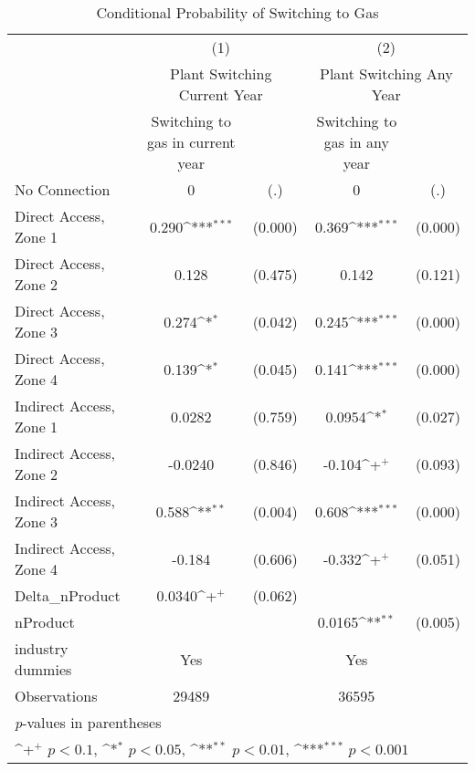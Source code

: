 \begin{table}[htbp]\centering
\def\sym#1{\ifmmode^{#1}\else\(^{#1}\)\fi}
\caption{Conditional Probability of Switching to Gas}
\begin{tabular}{l*{2}{cc}}
\toprule
                    &\multicolumn{2}{c}{(1)}           &\multicolumn{2}{c}{(2)}           \\
                    &\multicolumn{2}{c}{Plant Switching Current Year}&\multicolumn{2}{c}{Plant Switching Any Year}\\
                    &Switching to gas in current year         &            &Switching to gas in any year         &            \\
\midrule
No Connection       &           0         &         (.)&           0         &         (.)\\
Direct Access, Zone 1&       0.290\sym{***}&     (0.000)&       0.369\sym{***}&     (0.000)\\
Direct Access, Zone 2&       0.128         &     (0.475)&       0.142         &     (0.121)\\
Direct Access, Zone 3&       0.274\sym{*}  &     (0.042)&       0.245\sym{***}&     (0.000)\\
Direct Access, Zone 4&       0.139\sym{*}  &     (0.045)&       0.141\sym{***}&     (0.000)\\
Indirect Access, Zone 1&      0.0282         &     (0.759)&      0.0954\sym{*}  &     (0.027)\\
Indirect Access, Zone 2&     -0.0240         &     (0.846)&      -0.104\sym{+}  &     (0.093)\\
Indirect Access, Zone 3&       0.588\sym{**} &     (0.004)&       0.608\sym{***}&     (0.000)\\
Indirect Access, Zone 4&      -0.184         &     (0.606)&      -0.332\sym{+}  &     (0.051)\\
Delta\_nProduct      &      0.0340\sym{+}  &     (0.062)&                     &            \\
nProduct            &                     &            &      0.0165\sym{**} &     (0.005)\\
industry dummies    &         Yes         &            &         Yes         &            \\
\midrule
Observations        &       29489         &            &       36595         &            \\
\bottomrule
\multicolumn{5}{l}{\footnotesize \textit{p}-values in parentheses}\\
\multicolumn{5}{l}{\footnotesize \sym{+} \(p<0.1\), \sym{*} \(p<0.05\), \sym{**} \(p<0.01\), \sym{***} \(p<0.001\)}\\
\end{tabular}
\end{table}
